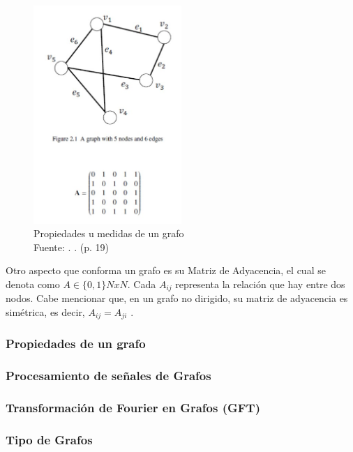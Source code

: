 \begin{figure}[h]
	\begin{center}
		\includegraphics[width=0.5\textwidth]{2/MT/6.jpg}
		\caption{Propiedades u medidas de un grafo \\
			Fuente: \citep*{bk_grafo}. . (p. 19)}
		\label{1:fig2}
	\end{center}
\end{figure}

Otro aspecto que conforma un grafo es su Matriz de Adyacencia, el cual se denota como $A \in \{0, 1\}$$NxN$. Cada $A_{ij}$ representa la relación que hay entre dos nodos. Cabe mencionar que, en un grafo no dirigido, su matriz de adyacencia es simétrica, es decir, $A_{ij} = A_{ji}$  \parencite{bk_grafo}.


\subsubsection{Propiedades de un grafo}
\subsubsection{Procesamiento de señales de Grafos}
\subsubsection{Transformación de Fourier en Grafos (GFT)}
\subsubsection{Tipo de Grafos}




